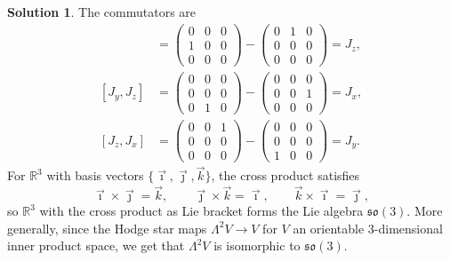 \documentclass[11pt, a4paper]{report}
\theoremstyle{definition}
\newtheorem{sol}{Solution}[part]
\begin{document}
\begin{sol}
The commutators are
\begin{align*}
    [J_x, J_y] &=
        \begin{pmatrix}
            0 & 0 & 0 \\
            1 & 0 & 0 \\
            0 & 0 & 0
        \end{pmatrix}
        - \begin{pmatrix}
            0 & 1 & 0 \\
            0 & 0 & 0 \\
            0 & 0 & 0
        \end{pmatrix}
        = J_z, \\
    [J_y, J_z] &=
        \begin{pmatrix}
            0 & 0 & 0 \\
            0 & 0 & 0 \\
            0 & 1 & 0
        \end{pmatrix}
        - \begin{pmatrix}
            0 & 0 & 0 \\
            0 & 0 & 1 \\
            0 & 0 & 0
        \end{pmatrix}
        = J_x, \\
    [J_z, J_x] &=
        \begin{pmatrix}
            0 & 0 & 1 \\
            0 & 0 & 0 \\
            0 & 0 & 0
        \end{pmatrix}
        - \begin{pmatrix}
            0 & 0 & 0 \\
            0 & 0 & 0 \\
            1 & 0 & 0
        \end{pmatrix}
        = J_y.
\end{align*}
For $\mathbb{R}^3$ with basis vectors $\{\vec{\imath}, \vec{\jmath}, \vec{k}\}$, the cross product satisfies
\[
    \vec{\imath} \times \vec{\jmath} = \vec{k}, \qquad
    \vec{\jmath} \times \vec{k} = \vec{\imath}, \qquad
    \vec{k} \times \vec{\imath} = \vec{\jmath},
\]
so $\mathbb{R}^3$ with the cross product as Lie bracket forms the Lie algebra $\mathfrak{so}(3)$.
More generally, since the Hodge star maps $\Lambda^2 V \to V$ for $V$ an orientable 3-dimensional inner product space, we get that $\Lambda^2 V$ is isomorphic to $\mathfrak{so}(3)$.

\end{sol}
\end{document}
